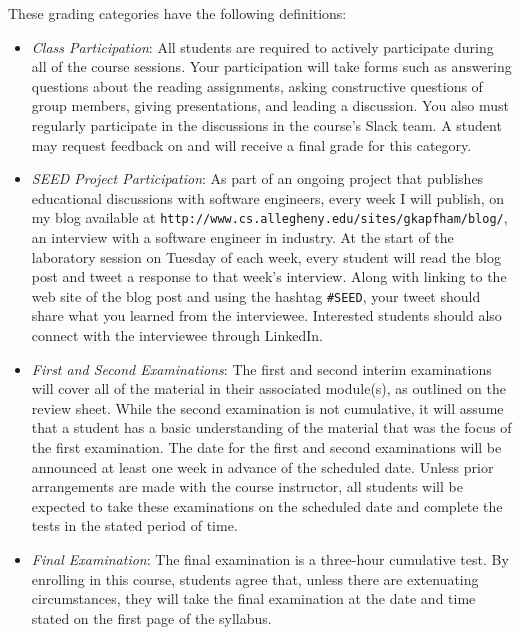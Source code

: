 \documentclass[11pt]{article}
\newcommand{\url}[1]{\lstinline{#1}}
\begin{document}
\vspace*{-.1in}
\noindent
These grading categories have the following definitions:
\vspace*{-.1in}

\begin{itemize}

  \item {\em Class Participation\/}: All students are required to actively participate during all of the course
    sessions. Your participation will take forms such as answering questions about the reading assignments, asking
    constructive questions of group members, giving presentations, and leading a discussion. You also must regularly
    participate in the discussions in the course's Slack team. A student may request feedback on and will receive a
    final grade for this category.

  \item {\em SEED Project Participation\/}: As part of an ongoing project that publishes educational discussions with
    software engineers, every week I will publish, on my blog available at
    \url{http://www.cs.allegheny.edu/sites/gkapfham/blog/}, an interview with a software engineer in industry. At the
    start of the laboratory session on Tuesday of each week, every student will read the blog post and tweet a response
    to that week's interview. Along with linking to the web site of the blog post and using the hashtag \url{#SEED},
    your tweet should share what you learned from the interviewee. Interested students should also connect with the
    interviewee through LinkedIn.

  \item {\em First and Second Examinations\/}: The first and second interim examinations will cover all of the material
    in their associated module(s), as outlined on the review sheet. While the second examination is not cumulative, it
    will assume that a student has a basic understanding of the material that was the focus of the first examination.
    The date for the first and second examinations will be announced at least one week in advance of the scheduled date.
    Unless prior arrangements are made with the course instructor, all students will be expected to take these
    examinations on the scheduled date and complete the tests in the stated period of time.

  \item {\em Final Examination\/}: The final examination is a three-hour cumulative test. By enrolling in this course,
    students agree that, unless there are extenuating circumstances, they will take the final examination at the date
    and time stated on the first page of the syllabus.


\end{itemize}
\end{document}
